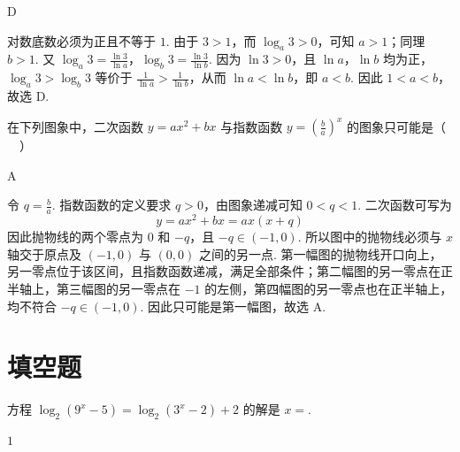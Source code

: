 \documentclass[UTF8,a4paper,oneside,11pt]{ctexbook}
\begin{document}
\begin{answer}
D
\end{answer}

\begin{solution}
对数底数必须为正且不等于 \(1\). 由于 \(3>1\)，而 \(\log_a3>0\)，可知 \(a>1\)；同理 \(b>1\). 又
\(\log_a3=\frac{\ln3}{\ln a}\)，\(\log_b3=\frac{\ln3}{\ln b}\).
因为 \(\ln3>0\)，且 \(\ln a\)，\(\ln b\) 均为正，\(\log_a3>\log_b3\) 等价于 \(\frac{1}{\ln a}>\frac{1}{\ln b}\)，从而 \(\ln a<\ln b\)，即 \(a<b\). 因此 \(1<a<b\)，故选 D.
\end{solution}

\begin{problem}
在下列图象中，二次函数 \(y=ax^2+bx\) 与指数函数 \(y=\left(\frac{b}{a}\right)^x\) 的图象只可能是（\(\quad\)）

\choices
    {}
    {}
    {}
    {}
\end{problem}

\begin{answer}
A
\end{answer}

\begin{solution}
令 \(q=\frac{b}{a}\). 指数函数的定义要求 \(q>0\)，由图象递减可知 \(0<q<1\). 二次函数可写为
\[
y=ax^2+bx=ax(x+q)
\]
因此抛物线的两个零点为 \(0\) 和 \(-q\)，且 \(-q\in(-1,0)\). 所以图中的抛物线必须与 \(x\) 轴交于原点及 \((-1,0)\) 与 \((0,0)\) 之间的另一点. 第一幅图的抛物线开口向上，另一零点位于该区间，且指数函数递减，满足全部条件；第二幅图的另一零点在正半轴上，第三幅图的另一零点在 \(-1\) 的左侧，第四幅图的另一零点也在正半轴上，均不符合 \(-q\in(-1,0)\). 因此只可能是第一幅图，故选 A.
\end{solution}

\section{填空题}

\begin{problem}
方程 \(\log_{2}\left(9^x-5\right)=\log_{2}\left(3^x-2\right)+2\) 的解是 \(x=\)\fillinblank{}.
\end{problem}

\begin{answer}
\(1\)
\end{answer}
\end{document}
